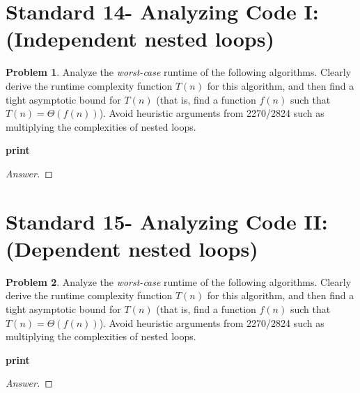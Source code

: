 \documentclass[11pt]{article}
\theoremstyle{definition}
\theoremstyle{definition}
\newtheorem{required}{Problem}
\theoremstyle{definition}
\begin{document}
\section{Standard 14- Analyzing Code I: (Independent nested loops)}
\begin{required}


Analyze the \textit{worst-case} runtime of the following algorithms. Clearly derive the runtime complexity function $T(n)$ for this algorithm, and then find a tight asymptotic bound for $T(n)$ (that is, find a function $f(n)$ such that $T(n) = \Theta(f(n))$). Avoid heuristic arguments from 2270/2824 such as multiplying the complexities of nested loops.



\begin{algorithm}
\caption{Nested Algorithm 1}\label{alg:Nested2}
\begin{algorithmic}[1]
		\State \textbf{print} 
	\EndFor
\EndFor
\EndProcedure
\end{algorithmic}
\end{algorithm}
\begin{proof}[Answer]
\end{proof}
\end{required}

\newpage
\section{Standard 15- Analyzing Code II: (Dependent nested loops)}
\begin{required}


Analyze the \textit{worst-case} runtime of the following algorithms. Clearly derive the runtime complexity function $T(n)$ for this algorithm, and then find a tight asymptotic bound for $T(n)$ (that is, find a function $f(n)$ such that $T(n) = \Theta(f(n))$). Avoid heuristic arguments from 2270/2824 such as multiplying the complexities of nested loops.


\begin{algorithm}
\caption{Nested Algorithm 2}\label{alg:NestedDependent1}
\begin{algorithmic}[1]
		\State \textbf{print} 
	\EndFor
\EndFor
\EndProcedure
\end{algorithmic}
\end{algorithm}
\end{required}

\begin{proof}[Answer]
\end{proof}
\end{document}
